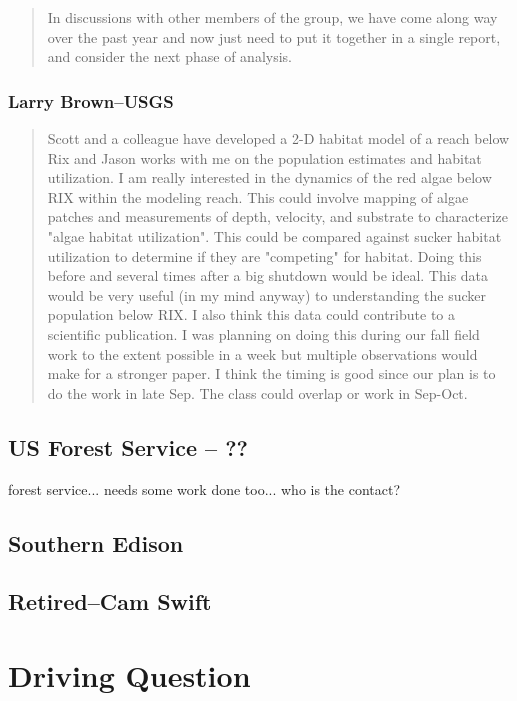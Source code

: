 \documentclass{article}\usepackage[]{graphicx}\usepackage[]{color}
\begin{document}
\begin{quote}
In discussions with other members of the group, we have come along way over the past year and now just need to put it together in a single report, and consider the next phase of analysis.  
\end{quote}

\subsubsection{Larry Brown--USGS}

\begin{quote}
Scott and a colleague have developed a 2-D habitat model of a reach below Rix and Jason works with me on the population estimates and habitat utilization. I am really interested in the dynamics of the red algae below RIX within the modeling reach. This could involve mapping of algae patches and measurements of depth, velocity, and substrate to characterize "algae habitat utilization". This could be compared against sucker habitat utilization to determine if they are "competing" for habitat. Doing this before and several times after a big shutdown would be ideal. This data would be very useful (in my mind anyway) to understanding the sucker population below RIX. I also think this data could contribute to a scientific publication. I was planning on doing this during our fall field work to the extent possible in a week but multiple observations would make for a stronger paper. I think the timing is good since our plan is to do the work in late Sep. The class could overlap or work in Sep-Oct.
\end{quote}

\subsection{US Forest Service -- ??}

forest service... needs some work done too... who is the contact?

\subsection{Southern Edison}


\subsection{Retired--Cam Swift}


\section{Driving Question}
\end{document}

